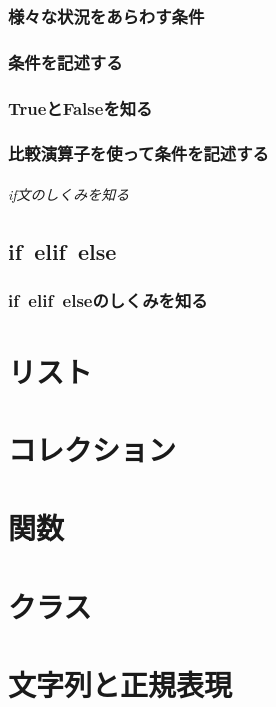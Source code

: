 \documentclass[11pt,a4paper]{jreport}
\begin{document}
\subsection{様々な状況をあらわす条件}

\subsection{条件を記述する}

\subsection{TrueとFalseを知る}

\subsection{比較演算子を使って条件を記述する}

\subparagraph{if文のしくみを知る}

\section{if~elif~else}
\subsection{if~elif~elseのしくみを知る}







\chapter{リスト}%

\chapter{コレクション}%

\chapter{関数}%

\chapter{クラス}%

\chapter{文字列と正規表現}%
\end{document}
